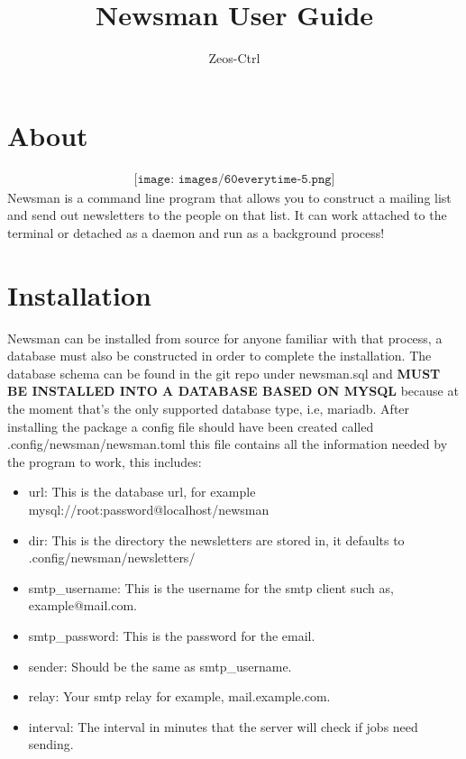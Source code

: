 \documentclass[12pt]{article}
\title{Newsman User Guide}
\author{Zeos-Ctrl}
\begin{document}
\maketitle
\newpage

\tableofcontents

\section{About}
\begin{align*}
    \texttt{[image: images/60everytime-5.png]}
\end{align*}
Newsman is a command line program that allows you to construct a mailing list and send 
out newsletters to the people on that list. It can work attached to the terminal 
or detached as a daemon and run as a background process!

\section{Installation}
Newsman can be installed from source for anyone familiar with that process,
a database must also be constructed in order to complete the installation.
The database schema can be found in the git repo under newsman.sql and 
\textbf{MUST BE INSTALLED INTO A DATABASE BASED ON MYSQL} because at the moment 
that's the only supported database type, i.e, mariadb. After installing 
the package a config file should have been created called 
.config/newsman/newsman.toml this file contains all the information
needed by the program to work, this includes:

\begin{itemize}
    \item url: This is the database url, for example 
        mysql://root:password@localhost/newsman 
    \item dir: This is the directory the newsletters are stored in,
        it defaults to .config/newsman/newsletters/
    \item smtp\_username: This is the username for the smtp client such as, 
        example@mail.com.
    \item smtp\_password: This is the password for the email.
    \item sender: Should be the same as smtp\_username.
    \item relay: Your smtp relay for example, mail.example.com.
    \item interval: The interval in minutes that the server will check if jobs 
        need sending.
\end{itemize}
\end{document}
